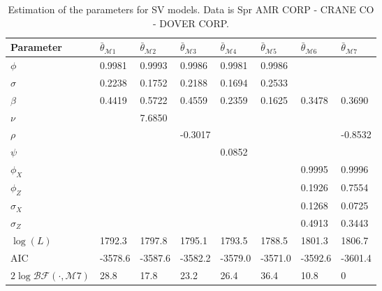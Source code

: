 \documentclass[11pt,a4,twosided,singlespacing,titlepagenumber=on]{scrreprt}
\numberwithin{equation}{chapter} %
\theoremstyle{remark}
\begin{document}
\begin{table}[H]
\centering
\begin{tabular}{llllllll}
Parameter        & $\bar{\theta}_{\mathcal{M}1}$ & $\bar{\theta}_{\mathcal{M}2}$ & $\bar{\theta}_{\mathcal{M}3}$ & $\bar{\theta}_{\mathcal{M}4}$ & $\bar{\theta}_{\mathcal{M}5}$ & $\bar{\theta}_{\mathcal{M}6}$& $\bar{\theta}_{\mathcal{M}7}$\\ 
\hline
$\phi$								                  & 0.9981  & 0.9993 & 0.9986  & 0.9981  & 0.9986 & \\
$\sigma$                                & 0.2238  & 0.1752 & 0.2188  & 0.1694  & 0.2533 & \\
$\beta$                                 & 0.4419  & 0.5722 & 0.4559  & 0.2359  & 0.1625 & 0.3478 & 0.3690\\
$\nu$                                   &         & 7.6850 &         &         &         &\\
$\rho$                                  &         &        & -0.3017 &         &         & & -0.8532\\
$\psi$                                  &         &        &         & 0.0852  &         & \\
$\phi_X$                                &         &        &         &         &         & 0.9995 & 0.9996\\
$\phi_Z$                                &         &        &         &         &         & 0.1926 & 0.7554\\
$\sigma_X$                              &         &        &         &         &         & 0.1268 & 0.0725\\
$\sigma_Z$                              &         &        &         &         &         & 0.4913 & 0.3443\\
$\log(L)$                               & 1792.3  & 1797.8 & 1795.1  & 1793.5  & 1788.5  & 1801.3 & 1806.7\\
AIC                                     & -3578.6 & -3587.6& -3582.2 & -3579.0 & -3571.0 & -3592.6 & -3601.4\\
$2 \log \mathcal{BF}(\cdot, \mathcal{M}7)$& 28.8    & 17.8      & 23.2    & 26.4    & 36.4    & 10.8 & 0 \\
\hline
\end{tabular}
\caption{Estimation of the parameters for SV models. Data is Spr AMR CORP - CRANE CO - DOVER CORP.}
\label{estimation_of_svm_appl_spr}
\end{table}
\end{document}
